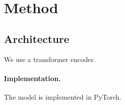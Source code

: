 \section{Method}
\subsection{Architecture}
We use a transformer encoder.

\paragraph{Implementation.}
The model is implemented in PyTorch.
